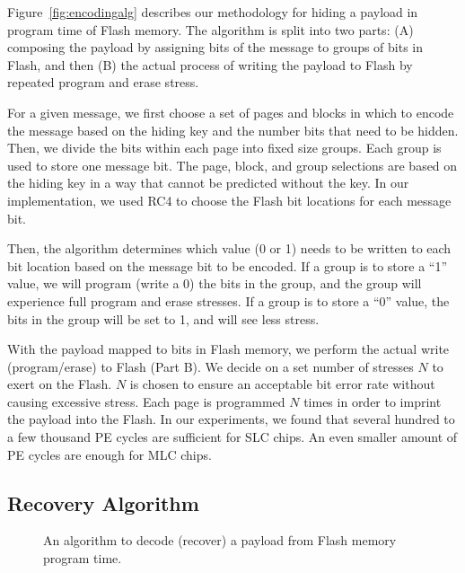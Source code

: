 Figure~\ref{fig:encodingalg} describes our methodology for hiding a payload in
program time of Flash memory. The algorithm is split into two parts: (A) composing the payload
by assigning bits of the message to groups of bits in Flash, and then (B) the actual process
of writing the payload to Flash by repeated program and erase stress.

For a given message, we first choose a set of pages and blocks in which to encode
the message based on the hiding key and the number bits that need to be hidden. 
Then, we divide the bits within each page into fixed size groups. %
Each group is used to store one message bit. 
The page, block, and group selections are based on the hiding key in a way that
cannot be predicted without the key. 
In our implementation, we used RC4 to choose the Flash bit locations for each message bit.

Then, the algorithm determines which value (0 or 1) needs to be written to each bit
location based on the message bit to be encoded.
If a group is to store a ``1'' value, we will
program (write a 0) the bits in the group, and the group will experience 
full program and erase stresses. If a group is to store a ``0'' value, the bits
in the group will be set to 1, and will see less stress.

With the payload mapped to bits in Flash memory, we perform the actual
write (program/erase) to Flash (Part B). We decide on a set number of stresses $N$ to exert
on the Flash. $N$ is chosen to ensure an acceptable
bit error rate without causing excessive stress. 
Each page is programmed $N$ times in order to imprint the
payload into the Flash.
In our experiments, we found that several hundred to a few thousand PE cycles are sufficient
for SLC chips. An even smaller amount of PE cycles are enough for MLC chips.


\subsection{Recovery Algorithm}

\begin{figure} 
\begin{center} 
 
\caption{An algorithm to decode (recover) a payload from Flash memory program time.}
\label{fig:decodingalg} 
\vspace{-0.25in}
\end{center} 
\end{figure}


